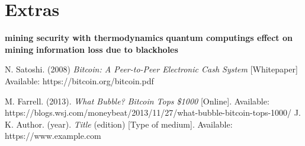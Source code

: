 \documentclass[conference]{IEEEtran}
\begin{document}
\section{Extras}
\textbf{mining security with thermodynamics}
\lipsum[1-2]
\textbf{quantum computings effect on mining}
\lipsum[1-2]
\textbf{information loss due to blackholes}
\lipsum[1-3]


\begin{thebibliography}{9}
	
	N. Satoshi. 
	(2008)
	\textit{Bitcoin: A Peer-to-Peer Electronic Cash System}
	[Whitepaper]
	Available: https://bitcoin.org/bitcoin.pdf

	M. Farrell. 
	(2013).	
	\textit{What Bubble? Bitcoin Tops \$1000}
	[Online].
	Available: https://blogs.wsj.com/moneybeat/2013/11/27/what-bubble-bitcoin-tops-1000/
	J. K. Author. 
	(year).	
	\textit{Title}
	(edition)
	[Type of medium].
	Available: https://www.example.com
\end{thebibliography}
\end{document}
